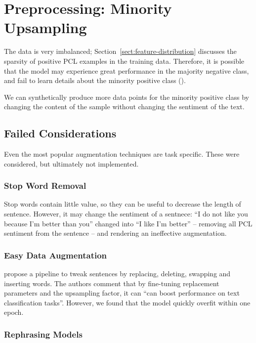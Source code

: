 \documentclass[11pt,a4paper]{article}
\begin{document}
\section{Preprocessing: Minority Upsampling}

The data is very imbalanced; Section~\ref{sect:feature-distribution} discusses the sparsity of positive PCL examples in the training data. Therefore, it is possible that the model may experience great performance in the majority negative class, and fail to learn details about the minority positive class (\citet{alberto-imbalanced-datasets}).

We can synthetically produce more data points for the minority positive class by changing the content of the sample without changing the sentiment of the text. 

\subsection{Failed Considerations}

Even the most popular augmentation techniques are task specific. These were considered, but ultimately not implemented.

\subsubsection{Stop Word Removal}

Stop words contain little value, so they can be useful to decrease the length of sentence. However, it may change the sentiment of a sentnece: ``I do not like you because I'm better than you'' changed into ``I like I'm better'' -- removing all PCL sentiment from the sentence -- and rendering an ineffective augmentation.

\subsubsection{Easy Data Augmentation}

\citet{wei-zou-2019-eda} propose a pipeline to tweak sentences by replacing, deleting, swapping and inserting words. The authors comment that by fine-tuning replacement parameters and the upsampling factor, it can ``can boost performance on text classification tasks''. However, we found that the model quickly overfit within one epoch.

\subsubsection{Rephrasing Models}
\end{document}
